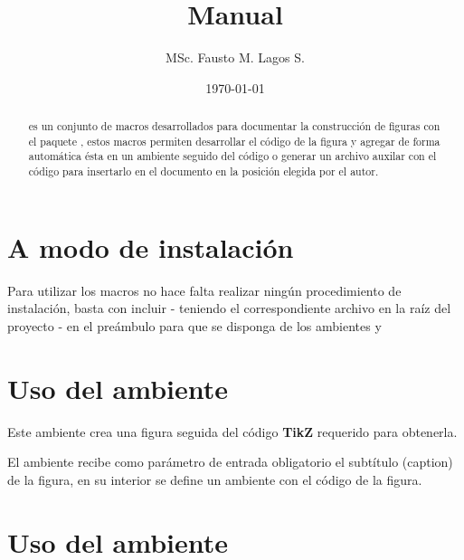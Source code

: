 \documentclass{article}
\title{Manual \bftt{TikZ2Code.tex}}
\author{MSc. Fausto M. Lagos S.}
\date{\today}
\begin{document}
\maketitle

\begin{abstract}
	 es un conjunto de macros desarrollados para documentar la construcción de figuras con el paquete , estos macros permiten desarrollar el código de la figura  y agregar de forma automática ésta en un ambiente  seguido del código o generar un archivo auxilar con el código para insertarlo en el documento en la posición elegida por el autor.
\end{abstract}

\section{A modo de instalación}

Para utilizar los macros  no hace falta realizar ningún procedimiento de instalación, basta con incluir \texttt{} - teniendo el correspondiente archivo en la raíz del proyecto - en el preámbulo para que se disponga de los ambientes  y 

\section{Uso del ambiente }

Este ambiente crea una figura seguida del código \textbf{TikZ} requerido para obtenerla.

\begin{exampletwouptinynoframe}
\begin{tikzPlusCode}
\end{tikzPlusCode}
\end{exampletwouptinynoframe}

El ambiente  recibe como parámetro de entrada obligatorio el subtítulo (caption) de la figura, en su interior se define un ambiente  con el código de la figura.

\section{Uso del ambiente }
\end{document}
